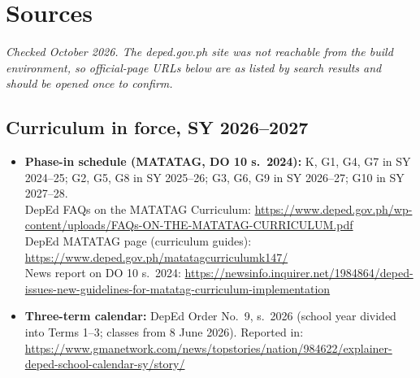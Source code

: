 \section{Sources}
\small
\textit{Checked October 2026. The deped.gov.ph site was not reachable from the build environment, so official-page URLs below are as listed by search results and should be opened once to confirm.}

\subsection*{Curriculum in force, SY 2026--2027}
\begin{itemize}[leftmargin=1.2em]
\item \textbf{Phase-in schedule (MATATAG, DO 10 s.\ 2024):} K, G1, G4, G7 in SY 2024--25; G2, G5, G8 in SY 2025--26; G3, G6, G9 in SY 2026--27; G10 in SY 2027--28.\\
DepEd FAQs on the MATATAG Curriculum: \url{https://www.deped.gov.ph/wp-content/uploads/FAQs-ON-THE-MATATAG-CURRICULUM.pdf}\\
DepEd MATATAG page (curriculum guides): \url{https://www.deped.gov.ph/matatagcurriculumk147/}\\
News report on DO 10 s.\ 2024: \url{https://newsinfo.inquirer.net/1984864/deped-issues-new-guidelines-for-matatag-curriculum-implementation}
\item \textbf{Three-term calendar:} DepEd Order No.\ 9, s.\ 2026 (school year divided into Terms 1--3; classes from 8 June 2026). Reported in: \url{https://www.gmanetwork.com/news/topstories/nation/984622/explainer-deped-school-calendar-sy/story/}
\end{itemize}

